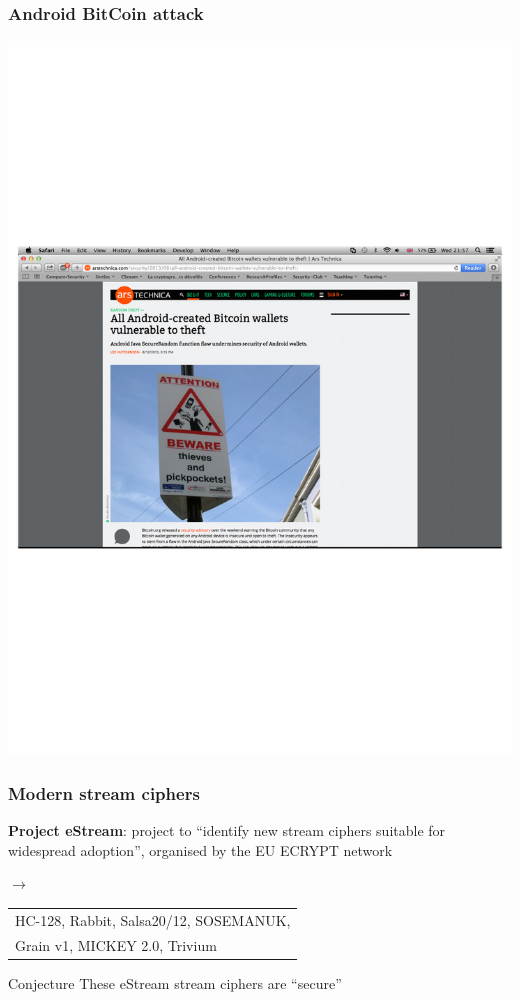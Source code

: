 \documentclass[aspectratio=169, lualatex, handout, 10pt,dvipsnames,svgnames]{beamer} %
\begin{document}
\begin{frame}
  \frametitle{Android BitCoin attack}
  \vspace{-0.5cm}
  \begin{center}
    \includegraphics[scale=0.65]{Images/AndroidBitcoinAttack.pdf}
  \end{center}


\end{frame}

\begin{frame}
  \frametitle{Modern stream ciphers}

  {\bf Project eStream}: project to ``identify new stream ciphers suitable for widespread adoption'', organised by the EU ECRYPT network

  $\longrightarrow$\begin{tabular}[t]{l}
    HC-128, Rabbit, Salsa20/12, SOSEMANUK, \\
    Grain v1, MICKEY 2.0, Trivium
  \end{tabular}
  \bigskip{}
  \pause

  \begin{block}{Conjecture}
    These eStream stream ciphers are ``secure''
  \end{block}

\end{frame}
\end{document}
